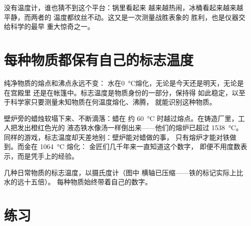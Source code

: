 \begin{remark}[眼睛看不见的数字]\label{rem:g4:changes-of-state:invisible}
没有温度计，谁也猜不到这个平台：锅里看起来
越来越热闹，冰桶看起来越来越平静，而两者的
温度都纹丝不动。这又是一次测量战胜表象的
胜利，也是仪器交给科学的最早
重大惊奇之一。
\end{remark}

\section{每种物质都保有自己的标志温度}

\begin{proposition}[标志温度是物质的身份标识]\label{prop:g4:changes-of-state:identity}
纯净物质的熔点和沸点永远不变：
水在\qty{0}{\celsius}熔化，无论是今天还是明天，无论是在宫殿里
还是在帐篷中。标志温度是物质身份的一部分，保持得
如此稳定，以至于科学家只要测量未知物质在何温度熔化、沸腾，
就能识别这种物质。
\end{proposition}

\begin{example}[蜡烛与铸造厂]\label{ex:g4:changes-of-state:foundry}
壁炉旁的蜡烛软塌下来、不断滴落：蜡在
约 \qty{60}{\celsius} 时越过熔点。在铸造厂里，工人把发出橙红色光的
液态铁水像汤一样倒出来——他们的熔炉已超过
\qty{1538}{\celsius}。同样的游戏，标志温度却天差地别：壁炉能对蜡做的事，
只有熔炉才能对铁做到。而金在 \qty{1064}{\celsius} 熔化：
金匠们几千年来一直知道这个数字，
即便不用度数表示，而是凭手上的经验。
\end{example}

\begin{omfigure}

{\small 几种日常物质的标志温度，以摄氏度计（图中
横轴已压缩——铁的标记实际上比水的远十五倍）。
每种物质始终带着自己的数字。}
\end{omfigure}

\section{练习}

